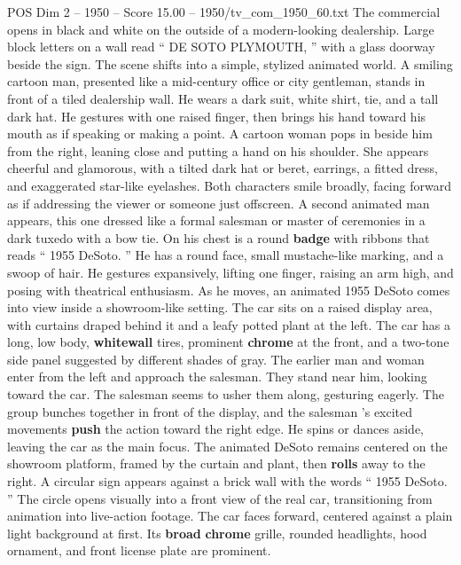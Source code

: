 \begin{textsample}{POS Dim 2 – 1950 – Score 15.00 – 1950/tv\_com\_1950\_60.txt}  \label{ex:f2_pos_084}
The commercial opens in black and white on the outside of a modern-looking dealership.
Large block letters on a wall read “ DE SOTO PLYMOUTH, ” with a glass doorway beside the sign.
The scene shifts into a simple, stylized animated world.
A smiling cartoon man, presented like a mid-century office or city gentleman, stands in front of a tiled dealership wall.
He wears a dark suit, white shirt, tie, and a tall dark hat.
He gestures with one raised finger, then brings his hand toward his mouth as if speaking or making a point.
A cartoon woman pops in beside him from the right, leaning close and putting a hand on his shoulder.
She appears cheerful and glamorous, with a tilted dark hat or beret, earrings, a fitted dress, and exaggerated star-like eyelashes.
Both characters smile broadly, facing forward as if addressing the viewer or someone just offscreen.
A second animated man appears, this one dressed like a formal salesman or master of ceremonies in a dark tuxedo with a bow tie.
On his chest is a round \textbf{badge} with ribbons that reads “ 1955 DeSoto. ” He has a round face, small mustache-like marking, and a swoop of hair.
He gestures expansively, lifting one finger, raising an arm high, and posing with theatrical enthusiasm.
As he moves, an animated 1955 DeSoto comes into view inside a showroom-like setting.
The car sits on a raised display area, with curtains draped behind it and a leafy potted plant at the left.
The car has a long, low body, \textbf{whitewall} tires, prominent \textbf{chrome} at the front, and a two-tone side panel suggested by different shades of gray.
The earlier man and woman enter from the left and approach the salesman.
They stand near him, looking toward the car.
The salesman seems to usher them along, gesturing eagerly.
The group bunches together in front of the display, and the salesman ’s excited movements \textbf{push} the action toward the right edge.
He spins or dances aside, leaving the car as the main focus.
The animated DeSoto remains centered on the showroom platform, framed by the curtain and plant, then \textbf{rolls} away to the right.
A circular sign appears against a brick wall with the words “ 1955 DeSoto. ” The circle opens visually into a front view of the real car, transitioning from animation into live-action footage.
The car faces forward, centered against a plain light background at first.
Its \textbf{broad} \textbf{chrome} grille, rounded headlights, hood ornament, and front license plate are prominent.

\end{textsample}
